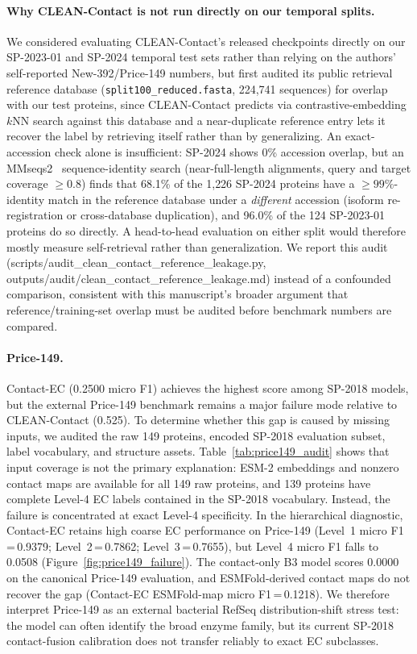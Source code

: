 \documentclass[11pt,a4paper]{article}
\begin{document}
\paragraph{Why CLEAN-Contact is not run directly on our temporal splits.}
We considered evaluating CLEAN-Contact's released checkpoints directly on our
SP-2023-01 and SP-2024 temporal test sets rather than relying on the authors'
self-reported New-392/Price-149 numbers, but first audited its public
retrieval reference database (\texttt{split100\_reduced.fasta}, 224{,}741
sequences) for overlap with our test proteins, since CLEAN-Contact predicts
via contrastive-embedding $k$NN search against this database and a
near-duplicate reference entry lets it recover the label by retrieving
itself rather than by generalizing. An exact-accession check alone is
insufficient: SP-2024 shows 0\% accession overlap, but an
MMseqs2~\citep{steinegger2017} sequence-identity search (near-full-length
alignments, query and target coverage $\geq0.8$) finds that 68.1\% of the
1{,}226 SP-2024 proteins have a $\geq99\%$-identity match in the reference
database under a \emph{different} accession (isoform re-registration or
cross-database duplication), and 96.0\% of the 124 SP-2023-01 proteins do so
directly. A head-to-head evaluation on either split would therefore mostly
measure self-retrieval rather than generalization. We report this audit
(scripts/audit\_clean\_contact\_reference\_leakage.py,
outputs/audit/clean\_contact\_reference\_leakage.md) instead of a confounded
comparison, consistent with this manuscript's broader argument that
reference/training-set overlap must be audited before benchmark numbers are
compared.

\paragraph{Price-149.}
Contact-EC (0.2500 micro F1) achieves the highest score among SP-2018 models,
but the external Price-149 benchmark remains a major failure mode relative to
CLEAN-Contact (0.525). To determine whether this gap is caused by missing inputs,
we audited the raw 149 proteins, encoded SP-2018 evaluation subset, label
vocabulary, and structure assets. Table~\ref{tab:price149_audit} shows that
input coverage is not the primary explanation: ESM-2 embeddings and nonzero
contact maps are available for all 149 raw proteins, and 139 proteins have
complete Level-4 EC labels contained in the SP-2018 vocabulary. Instead, the
failure is concentrated at exact Level-4 specificity. In the hierarchical
diagnostic, Contact-EC retains high coarse EC performance on Price-149
(Level~1 micro F1\,=\,0.9379; Level~2\,=\,0.7862; Level~3\,=\,0.7655), but
Level~4 micro F1 falls to 0.0508 (Figure~\ref{fig:price149_failure}). The
contact-only B3 model scores 0.0000 on the canonical Price-149 evaluation, and
ESMFold-derived contact maps do not recover the gap (Contact-EC ESMFold-map
micro F1\,=\,0.1218). We therefore interpret Price-149 as an external
bacterial RefSeq distribution-shift stress test: the model can often identify
the broad enzyme family, but its current SP-2018 contact-fusion calibration does
not transfer reliably to exact EC subclasses.
\end{document}

